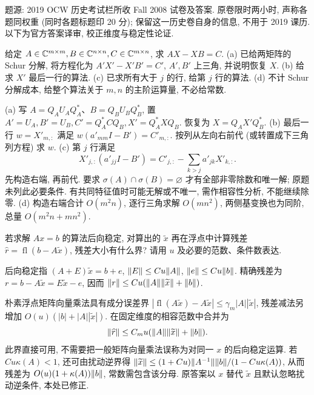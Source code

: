 题源: 2019 OCW 历史考试栏所收 Fall 2008 试卷及答案. 原卷限时两小时, 声称各题同权重 (同时各题标题印 20 分); 保留这一历史卷自身的信息, 不用于 2019 课历. 以下为官方答案译审, 校正维度与稳定性论证.
\begin{exercise}\label{e2008:q1}
给定 $A\in\mathbb C^{m\times m},B\in\mathbb C^{n\times n},C\in\mathbb C^{m\times n}$, 求 $AX-XB=C$.
(a) 已给两矩阵的 Schur 分解, 将方程化为 $A'X'-X'B'=C'$, $A',B'$ 上三角, 并说明恢复 $X$.
(b) 给求 $X'$ 最后一行的算法.
(c) 已求所有大于 $j$ 的行, 给第 $j$ 行的算法.
(d) 不计 Schur 分解成本, 给整个算法关于 $m,n$ 的主阶运算量, 不必给常数.
\end{exercise}
\begin{solution}
(a) 写 $A=Q_AU_AQ_A^*$、$B=Q_BU_BQ_B^*$, 置 $A'=U_A,B'=U_B,C'=Q_A^*CQ_B,X'=Q_A^*XQ_B$. 恢复为 $X=Q_AX'Q_B^*$.
(b) 最后一行 $w=X'_{m,:}$ 满足 $w(a'_{mm}I-B')=C'_{m,:}$. 按列从左向右前代 (或转置成下三角列方程) 求 $w$.
(c) 第 $j$ 行满足
\[
 X'_{j,:}(a'_{jj}I-B')=C'_{j,:}-\sum_{k>j}a'_{jk}X'_{k,:}.
\]
先构造右端, 再前代. 要求 $\sigma(A)\cap\sigma(B)=\varnothing$ 才有全部非零除数和唯一解; 原题未列此必要条件. 有共同特征值时可能无解或不唯一, 需作相容性分析, 不能继续除零.
(d) 构造右端合计 $O(m^2n)$, 逐行三角求解 $O(mn^2)$, 两侧基变换也为同阶, 总量 $O(m^2n+mn^2)$.
\end{solution}
\begin{exercise}\label{e2008:q2}
若求解 $Ax=b$ 的算法后向稳定, 对算出的 $\widetilde x$ 再在浮点中计算残差 $\widehat r=\operatorname{fl}(b-A\widetilde x)$, 残差大小有什么界? 请用 $u$ 及必要的范数、条件数表达.
\end{exercise}
\begin{solution}
后向稳定指 $(A+E)\widetilde x=b+e$, $\lVert E\rVert\le C u\lVert A\rVert$, $\lVert e\rVert\le C u\lVert b\rVert$. 精确残差为 $r=b-A\widetilde x=E\widetilde x-e$, 因而 $\lVert r\rVert\le C u(\lVert A\rVert\lVert \widetilde x\rVert+\lVert b\rVert)$.

朴素浮点矩阵向量乘法具有成分误差界 $|\operatorname{fl}(A\widetilde x)-A\widetilde x|\le\gamma_m|A||\widetilde x|$, 残差减法另增加 $O(u)(|b|+|A||\widetilde x|)$. 在固定维度的相容范数中合并为
\[
 \lVert \widehat r\rVert\le C_m u(\lVert A\rVert\lVert \widetilde x\rVert+\lVert b\rVert).
\]
此界直接可用, 不需要把一般矩阵向量乘法误称为对同一 $x$ 的后向稳定运算. 若 $Cu\kappa(A)<1$, 还可由扰动逆界得 $\lVert \widetilde x\rVert\le(1+Cu)\lVert A^{-1}\rVert\lVert b\rVert/(1-Cu\kappa(A))$, 从而残差为 $O(u)(1+\kappa(A))\lVert b\rVert$, 常数需包含该分母. 原答案以 $x$ 替代 $\widetilde x$ 且默认忽略扰动逆条件, 本处已修正.
\end{solution}
